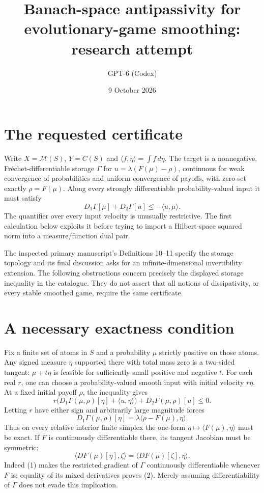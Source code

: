 \documentclass[11pt]{article}
\title{Banach-space antipassivity for evolutionary-game smoothing: research attempt}
\author{GPT-6 (Codex)}
\date{9 October 2026}
\begin{document}
\maketitle

\section*{The requested certificate}
Write $X=\mathcal M(S)$, $Y=C(S)$ and $\langle f,\eta\rangle=\int f\,d\eta$. The target is a nonnegative, Fr\'echet-differentiable storage $\Gamma$ for $u=\lambda(F(\mu)-\rho)$, continuous for weak convergence of probabilities and uniform convergence of payoffs, with zero set exactly $\rho=F(\mu)$. Along every strongly differentiable probability-valued input it must satisfy
\[
 D_1\Gamma[\dot\mu]+D_2\Gamma[u]\leq-\langle u,\dot\mu\rangle.
\]
The quantifier over every input velocity is unusually restrictive. The first calculation below exploits it before trying to import a Hilbert-space squared norm into a measure/function dual pair.

The inspected primary manuscript's Definitions 10--11 specify the storage topology and its final discussion asks for an infinite-dimensional invertibility extension. The following obstructions concern precisely the displayed storage inequality in the catalogue. They do not assert that all notions of dissipativity, or every stable smoothed game, require the same certificate.

\section*{A necessary exactness condition}
Fix a finite set of atoms in $S$ and a probability $\mu$ strictly positive on those atoms. Any signed measure $\eta$ supported there with total mass zero is a two-sided tangent: $\mu+t\eta$ is feasible for sufficiently small positive and negative $t$. For each real $r$, one can choose a probability-valued smooth input with initial velocity $r\eta$. At a fixed initial payoff $\rho$, the inequality gives
\[
 r\bigl(D_1\Gamma(\mu,\rho)[\eta]+\langle u,\eta\rangle\bigr)
 +D_2\Gamma(\mu,\rho)[u]\leq0.
\]
Letting $r$ have either sign and arbitrarily large magnitude forces
\[
 D_1\Gamma(\mu,\rho)[\eta]=\lambda\langle\rho-F(\mu),\eta\rangle. \tag{1}
\]
Thus on every relative interior finite simplex the one-form $\eta\mapsto\langle F(\mu),\eta\rangle$ must be exact. If $F$ is continuously differentiable there, its tangent Jacobian must be symmetric:
\[
 \langle DF(\mu)[\eta],\zeta\rangle
 =\langle DF(\mu)[\zeta],\eta\rangle. \tag{2}
\]
Indeed (1) makes the restricted gradient of $\Gamma$ continuously differentiable whenever $F$ is; equality of its mixed derivatives proves (2). Merely assuming differentiability of $\Gamma$ does not evade this implication.
\end{document}
